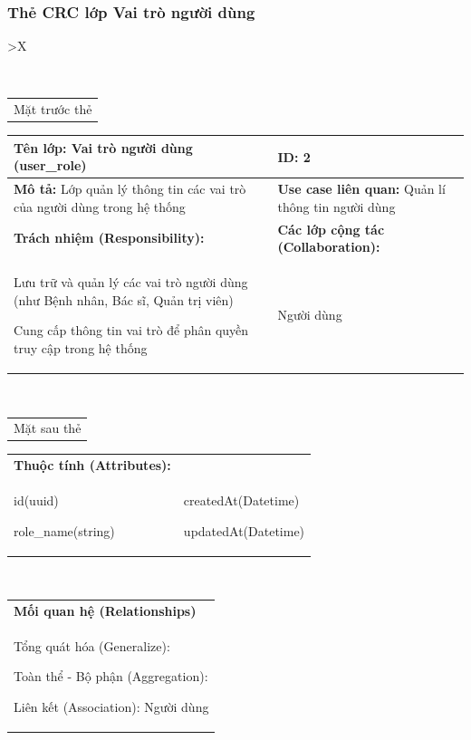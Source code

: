 \cleardoublepage

\subsubsection{Thẻ CRC lớp Vai trò người dùng}

\begin{xltabular}{\textwidth}{
		>{\centering\arraybackslash}X
	}
	\caption{\bfseries \fontsize{12pt}{0pt}\selectfont Thẻ CRC lớp Vai trò người dùng}
	\\
	\begin{tabularx}{0.9\textwidth}{X}
		Mặt trước thẻ
	\end{tabularx}
	\begin{tabularx}{0.9\textwidth}{|X|X|}
		\hline
		\textbf{Tên lớp:} Vai trò người dùng (user\_role)                               & \textbf{ID:} 2                                             \\
		\hline
		\textbf{Mô tả:} Lớp quản lý thông tin các vai trò của người dùng trong hệ thống & \textbf{Use case liên quan:}  Quản lí thông tin người dùng \\
		\hline
		\textbf{Trách nhiệm (Responsibility):}                                          & \textbf{Các lớp cộng tác (Collaboration):}                 \\
		Lưu trữ và quản lý các vai trò người dùng (như Bệnh nhân, Bác sĩ, Quản trị viên)

		Cung cấp thông tin vai trò để phân quyền truy cập trong hệ thống
		                                                                                &
		Người dùng
		\\
		\hline
	\end{tabularx}
	\\
	\begin{tabularx}{0.9\textwidth}{X}
		Mặt sau thẻ
	\end{tabularx}
	\begin{tabularx}{0.9\textwidth}{|X|X|}
		\hline
		\textbf{Thuộc tính (Attributes):} & \\
		id(uuid)

		role\_name(string)
		                                  &
		createdAt(Datetime)

		updatedAt(Datetime)
		\\ \hline
	\end{tabularx}
	\\
	\begin{tabularx}{0.9\textwidth}{|X|}
		\hline
		\textbf{Mối quan hệ (Relationships)} \\
		Tổng quát hóa (Generalize):

		Toàn thể - Bộ phận (Aggregation):

		Liên kết (Association): Người dùng
		\\
		\hline
	\end{tabularx}
\end{xltabular}

